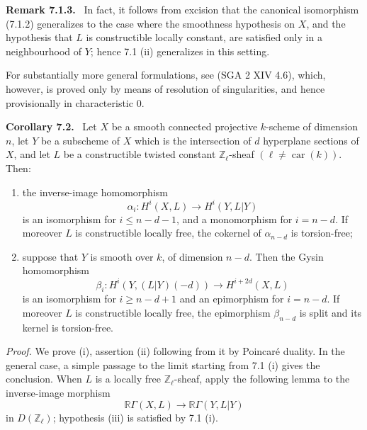 \documentclass[11pt]{article}
\newenvironment{statement}[1]{\par\medskip\noindent\textbf{#1.}\ }{\par\medskip}
\begin{document}
\begin{statement}{Remark 7.1.3}
In fact, it follows from excision that the canonical isomorphism (7.1.2) generalizes to the case where the smoothness hypothesis on $X$, and the hypothesis that $L$ is constructible locally constant, are satisfied only in a neighbourhood of $Y$; hence 7.1 (ii) generalizes in this setting.

For substantially more general formulations, see (SGA 2 XIV 4.6), which, however, is proved only by means of resolution of singularities, and hence provisionally in characteristic $0$.
\end{statement}

\begin{statement}{Corollary 7.2}
Let $X$ be a smooth connected projective $k$-scheme of dimension $n$, let $Y$ be a subscheme of $X$ which is the intersection of $d$ hyperplane sections of $X$, and let $L$ be a constructible twisted constant $\mathbb Z_\ell$-sheaf $(\ell\ne\operatorname{car}(k))$. Then:
\begin{enumerate}[label=(\roman*)]
\item the inverse-image homomorphism
\[
\alpha_i:H^i(X,L)\to H^i(Y,L|Y)
\]
is an isomorphism for $i\le n-d-1$, and a monomorphism for $i=n-d$. If moreover $L$ is constructible locally free, the cokernel of $\alpha_{n-d}$ is torsion-free;
\item suppose that $Y$ is smooth over $k$, of dimension $n-d$. Then the Gysin homomorphism
\[
\beta_i:H^i(Y,(L|Y)(-d))\to H^{i+2d}(X,L)
\]
is an isomorphism for $i\ge n-d+1$ and an epimorphism for $i=n-d$. If moreover $L$ is constructible locally free, the epimorphism $\beta_{n-d}$ is split and its kernel is torsion-free.
\end{enumerate}
\end{statement}

\emph{Proof.} We prove (i), assertion (ii) following from it by Poincaré duality. In the general case, a simple passage to the limit starting from 7.1 (i) gives the conclusion. When $L$ is a locally free $\mathbb Z_\ell$-sheaf, apply the following lemma to the inverse-image morphism
\[
\mathbb{R}\Gamma(X,L)\to \mathbb{R}\Gamma(Y,L|Y)
\]
in $D(\mathbb Z_\ell)$; hypothesis (iii) is satisfied by 7.1 (i).
\end{document}
